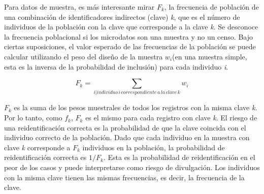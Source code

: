 \documentclass[]{book}
\newenvironment{Shaded}{\begin{snugshade}}{\end{snugshade}}
\newcommand{\CommentTok}[1]{\textcolor[rgb]{0.56,0.35,0.01}{\textit{#1}}}
\newcommand{\DataTypeTok}[1]{\textcolor[rgb]{0.13,0.29,0.53}{#1}}
\newcommand{\DecValTok}[1]{\textcolor[rgb]{0.00,0.00,0.81}{#1}}
\newcommand{\KeywordTok}[1]{\textcolor[rgb]{0.13,0.29,0.53}{\textbf{#1}}}
\newcommand{\NormalTok}[1]{#1}
\newcommand{\OperatorTok}[1]{\textcolor[rgb]{0.81,0.36,0.00}{\textbf{#1}}}
\newcommand{\StringTok}[1]{\textcolor[rgb]{0.31,0.60,0.02}{#1}}
\theoremstyle{definition}
\theoremstyle{definition}
\theoremstyle{definition}
\theoremstyle{definition}
\theoremstyle{remark}
\begin{document}
\begin{Shaded}
\end{Shaded}

Para datos de muestra, es más interesante mirar \(F_{k}\), la frecuencia de población de una combinación de identificadores indirectos (clave) \emph{k}, que es el número de individuos de la población con la clave que corresponde a la clave \emph{k}. Se desconoce la frecuencia poblacional si los microdatos son una muestra y no un censo. Bajo ciertas suposiciones, el valor esperado de las frecuencias de la población se puede calcular utilizando el peso del diseño de la muestra \(w_{i}\)(en una muestra simple, esta es la inversa de la probabilidad de inclusión) para cada individuo \emph{i}.

\[F_{k}=\sum_{i|individuo\,i\, correspondiente\, a\, la\, clave\, k} w_{i}\]

\(F_{k}\) es la suma de los pesos muestrales de todos los registros con la misma clave \emph{k}. Por lo tanto, como \(f_{k}\), \(F_{k}\) es el mismo para cada registro con clave \emph{k}. El riesgo de una reidentificación correcta es la probabilidad de que la clave coincida con el individuo correcto de la población. Dado que cada individuo en la muestra con clave \emph{k} corresponde a \(F_{k}\) individuos en la población, la probabilidad de reidentificación correcta es \(1/F_{k}\). Esta es la probabilidad de reidentificación en el peor de los casos y puede interpretarse como riesgo de divulgación. Los individuos con la misma clave tienen las mismas frecuencias, es decir, la frecuencia de la clave.
\end{document}
